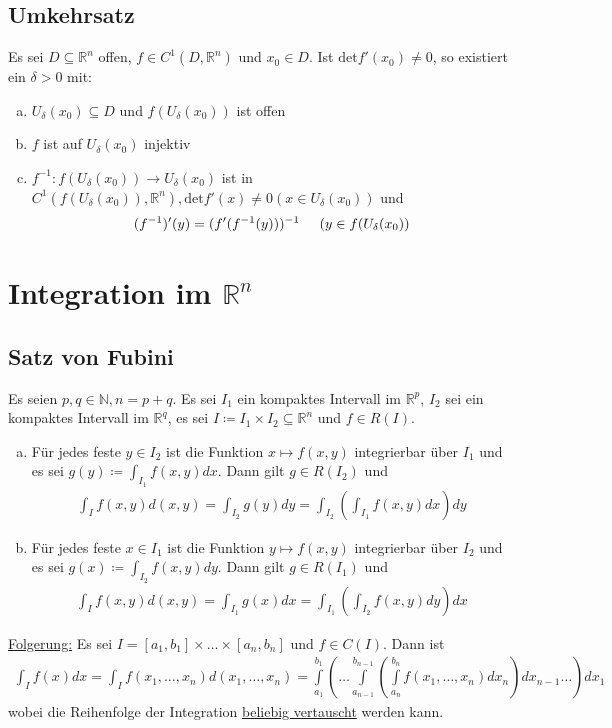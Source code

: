 \documentclass{article}
\begin{document}
\subsection{Umkehrsatz}
Es sei $D \subseteq \mathbb{R}^n$ offen, $f \in C^1(D, \mathbb{R}^n)$ und $x_0 \in D$. Ist $\text{det}f'(x_0) \neq 0$, so existiert ein
$\delta > 0$ mit:
\begin{enumerate} [a)]
    \item $U_\delta(x_0) \subseteq D$ und $f(U_\delta(x_0))$ ist offen
    \item $f$ ist auf $U_\delta(x_0)$ injektiv
    \item $f^{-1}: f(U_\delta(x_0)) \to U_\delta(x_0)$ ist in $C^1(f(U_\delta(x_0)),\mathbb{R}^n), \text{det}f'(x) \neq 0 (x \in U_\delta(x_0))$ und
    \begin{align*}
        (f^{-1})'(y) = (f'(f^{-1}(y)))^{-1} \hspace{0.5cm} (y \in f(U_\delta(x_0))
    \end{align*}
\end{enumerate}

\section{Integration im $\mathbb{R}^n$}
\subsection{Satz von Fubini}
Es seien $p,q \in \mathbb{N}, n=p+q$. Es sei $I_1$ ein kompaktes Intervall im $\mathbb{R}^p$, $I_2$ sei ein kompaktes Intervall im $\mathbb{R}^q$,
es sei $I \coloneqq I_1 \times I_2 \subseteq \mathbb{R}^n$ und $f \in R(I)$.
\begin{enumerate} [a)]
    \item Für jedes feste $y \in I_2$ ist die Funktion $x \mapsto f(x,y)$ integrierbar über  $I_1$ und es sei 
    $g(y) \coloneqq \int_{I_1} f(x,y) dx$. Dann gilt $g \in R(I_2)$ und
    \begin{align*}
        \int_I f(x,y) d(x,y) = \int_{I_2} g(y) dy = \int_{I_2} (\int_{I_1} f(x,y) dx) dy
    \end{align*}
    \item Für jedes feste $x \in I_1$ ist die Funktion $y \mapsto f(x,y)$ integrierbar über  $I_2$ und es sei 
    $g(x) \coloneqq \int_{I_2} f(x,y) dy$. Dann gilt $g \in R(I_1)$ und
    \begin{align*}
        \int_I f(x,y) d(x,y) = \int_{I_1} g(x) dx = \int_{I_1} (\int_{I_2} f(x,y) dy) dx
    \end{align*}
\end{enumerate}
\underline{Folgerung:} Es sei $I = [a_1,b_1] \times \ldots \times [a_n,b_n]$ und $f \in C(I)$. Dann ist
\begin{align*}
    \int_I f(x) dx = \int_I f(x_1, \ldots, x_n) d(x_1, \ldots, x_n) = \int \limits_{a_1}^{b_1} (\ldots \int \limits_{a_{n-1}}^{b_{n-1}}(\int \limits_{a_n}^{b_n}
    f(x_1,\ldots,x_n)dx_n)dx_{n-1}\ldots) dx_1
\end{align*}
wobei die Reihenfolge der Integration \underline{beliebig vertauscht} werden kann.
\end{document}
